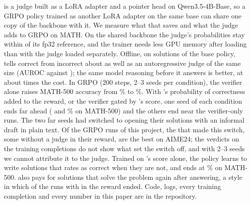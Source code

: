 \kev{} is a judge built as a LoRA adapter and a pointer head on Qwen3.5-4B-Base, so a GRPO policy trained as another
LoRA adapter on the same base can share one copy of the backbone with it. We measure what that saves and what the judge
adds to GRPO on MATH. On the shared backbone the judge's probabilities stay within  of its fp32
reference, and the trainer needs  less GPU memory after loading than with the judge loaded
separately. Offline, on  solutions of the base policy, \kev{} tells correct from incorrect about as
well as an autoregressive judge of the same size (AUROC  against ); the same
model reasoning before it answers is better, at about  times the cost. In GRPO (200 steps, 2--3
seeds per condition), the verifier alone raises MATH-500 accuracy from \% to \%.
With \kev{}'s probability of correctness added to the reward, or the verifier gated by \kev{}'s score, one seed of each
condition ends far ahead ( and \% on MATH-500) and the others end near
the verifier-only runs. The two far seeds had switched to opening their solutions with an informal draft in plain text. Of
the  GRPO runs of this project, the  that made this switch, some without a judge in their
reward, are the  best on AIME24; the verdicts on the training completions do not show what set the
switch off, and with 2--3 seeds we cannot attribute it to the judge. Trained on \kev{}'s score alone, the policy learns
to write solutions that \kev{} rates as correct when they are not, and ends at \% on MATH-500.
\kev{} also pays for solutions that solve the problem again after answering, a style in which  of the
 runs with \kev{} in the reward ended. Code, logs, every training completion and every number in this paper are in the repository.
